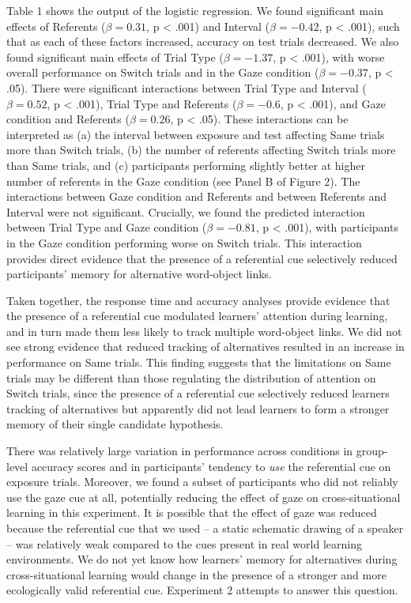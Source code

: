 \documentclass[authoryear, review]{elsarticle}
\begin{document}
Table 1 shows the output of the logistic regression. We found
significant main effects of Referents (\(\beta = 0.31\), p \textless{}
.001) and Interval (\(\beta = -0.42\), p \textless{} .001), such that as
each of these factors increased, accuracy on test trials decreased. We
also found significant main effects of Trial Type (\(\beta = -1.37\), p
\textless{} .001), with worse overall performance on Switch trials and
in the Gaze condition (\(\beta = -0.37\), p \textless{} .05). There were
significant interactions between Trial Type and Interval
(\(\beta = 0.52\), p \textless{} .001), Trial Type and Referents
(\(\beta = -0.6\), p \textless{} .001), and Gaze condition and Referents
(\(\beta = 0.26\), p \textless{} .05). These interactions can be
interpreted as (a) the interval between exposure and test affecting Same
trials more than Switch trials, (b) the number of referents affecting
Switch trials more than Same trials, and (c) participants performing
slightly better at higher number of referents in the Gaze condition (see
Panel B of Figure 2). The interactions between Gaze condition and
Referents and between Referents and Interval were not significant.
Crucially, we found the predicted interaction between Trial Type and
Gaze condition (\(\beta = -0.81\), p \textless{} .001), with
participants in the Gaze condition performing worse on Switch trials.
This interaction provides direct evidence that the presence of a
referential cue selectively reduced participants' memory for alternative
word-object links.

Taken together, the response time and accuracy analyses provide evidence
that the presence of a referential cue modulated learners' attention
during learning, and in turn made them less likely to track multiple
word-object links. We did not see strong evidence that reduced tracking
of alternatives resulted in an increase in performance on Same trials.
This finding suggests that the limitations on Same trials may be
different than those regulating the distribution of attention on Switch
trials, since the presence of a referential cue selectively reduced
learners tracking of alternatives but apparently did not lead learners
to form a stronger memory of their single candidate hypothesis.

There was relatively large variation in performance across conditions in
group-level accuracy scores and in participants' tendency to \emph{use}
the referential cue on exposure trials. Moreover, we found a subset of
participants who did not reliably use the gaze cue at all, potentially
reducing the effect of gaze on cross-situational learning in this
experiment. It is possible that the effect of gaze was reduced because
the referential cue that we used -- a static schematic drawing of a
speaker -- was relatively weak compared to the cues present in real
world learning environments. We do not yet know how learners' memory for
alternatives during cross-situational learning would change in the
presence of a stronger and more ecologically valid referential cue.
Experiment 2 attempts to answer this question.
\end{document}
